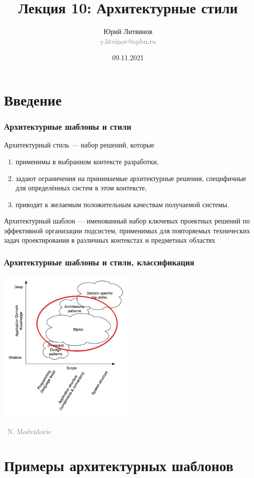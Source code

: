 \documentclass[xetex,mathserif,serif]{beamer}
\title{Лекция 10: Архитектурные стили}
\author[Юрий Литвинов]{Юрий Литвинов\\\small{\textcolor{gray}{y.litvinov@spbu.ru}}}
\date{09.11.2021}
\newcommand{\attribution}[1] {
    \vspace{-5mm}\begin{flushright}\begin{scriptsize}\textcolor{gray}{\textcopyright\, #1}\end{scriptsize}\end{flushright}
}
\begin{document}
    
    \frame{\titlepage}

    \section{Введение}

    \begin{frame}
        \frametitle{Архитектурные шаблоны и стили}
        Архитектурный стиль --- набор решений, которые
        \begin{enumerate}
            \item применимы в выбранном контексте разработки,
            \item задают ограничения на принимаемые архитектурные решения, специфичные для определённых систем в этом контексте,
            \item приводят к желаемым положительным качествам получаемой системы.
        \end{enumerate}
        Архитектурный шаблон --- именованный набор ключевых проектных решений по эффективной организации подсистем, применимых для повторяемых технических задач проектирования в различных контекстах и предметных областях
    \end{frame}

    \begin{frame}
        \frametitle{Архитектурные шаблоны и стили, классификация}
        \begin{center}
            \includegraphics[width=0.5\textwidth]{architecturalStylesHighlighted.png}
            \attribution{N. Medvidovic}
        \end{center}
    \end{frame}

    \section{Примеры архитектурных шаблонов}
\end{document}
